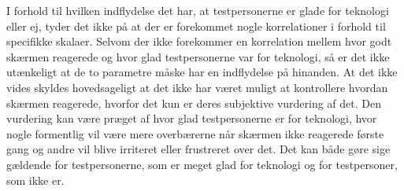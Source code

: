 \noindent
%
I forhold til hvilken indflydelse det har, at testpersonerne er glade for teknologi eller ej, tyder det ikke på at der er forekommet nogle korrelationer i forhold til specifikke skalaer. Selvom der ikke forekommer en korrelation mellem hvor godt skærmen reagerede og hvor glad testpersonerne var for teknologi, så er det ikke utænkeligt at de to parametre måske har en indflydelse på hinanden. At det ikke vides skyldes hovedsageligt at det ikke har været muligt at kontrollere hvordan skærmen reagerede, hvorfor det kun er deres subjektive vurdering af det. Den vurdering kan være præget af hvor glad testpersonerne er for teknologi, hvor nogle formentlig vil være mere overbærerne når skærmen ikke reagerede første gang og andre vil blive irriteret eller frustreret over det. Det kan både gøre sige gældende for testpersonerne, som er meget glad for teknologi og for testpersoner, som ikke er. 

